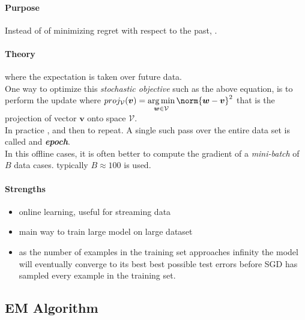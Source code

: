 \paragraph{Purpose}
Instead of of minimizing regret with respect to the past, .
\paragraph{Theory}
 where the expectation is taken over future data.\\
One way to optimize this \emph{stochastic objective} such as the above equation, is to perform the
update 
where $proj_{\mathcal{V}}(\bm{v}) = \displaystyle\argmin_{\bm{w}\in\mathcal{V}}\norm{\bm{w}-\bm{v}}^{
2}$ that is the projection of vector $\bm{v}$ onto space $\mathcal{V}$.\\
In practice , 
and then to repeat. A single such pass over the entire data set is called and 
\textbf{\emph{epoch}}.\\
In this offline cases, it is often better to compute the gradient of a \emph{mini-batch} of $B$
data cases.  typically $B\approx 100$ is used.

\paragraph{Strengths}
\begin{itemize}
    \item online learning, useful for streaming data
    \item main way to train large model on large dataset
    \item as the number of examples in the training set approaches infinity the model will eventually
        converge to its best best possible test errors before SGD has sampled every example in the 
        training set.
\end{itemize}



\subsection{EM Algorithm}
